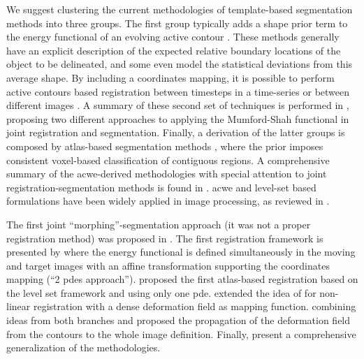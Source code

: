 We suggest clustering the
current methodologies of template-based segmentation methods into three groups.
The first group typically adds a shape prior term to the energy functional of
\citep{chan_level_2005,chen_using_2002,cremers_kernel_2006,gastaud_combining_2004,wyatt_map_2003,paragios_level_2003,yezzi_variational_2003,gorthi_segmentation_2009,pohl_unifying_2005,pohl_bayesian_2006,wang_joint_2006,guyader_combined_2011,besson_dream2s_2003,bertero_illposed_1988,cote_tractometer_2013}
an evolving active contour \citep{bresson_variational_2006, chan_level_2005,
chen_using_2002,cremers_kernel_2006,gastaud_combining_2004}.
These methods generally have an explicit description of the expected relative boundary
locations of the object to be delineated, and some even model the statistical deviations
from this average shape. By including a coordinates mapping, it is possible to perform
active contours based registration between timesteps in a time-series or between different
images \citep{bertalmio_morphing_2000,wyatt_map_2003,paragios_level_2003,vemuri_joint_2003,
yezzi_variational_2003}.
A summary of these second set of techniques is performed in \citep{droske_mumfordshah_2009},
proposing two different approaches to applying the Mumford-Shah \citep{mumford_optimal_1989}
functional in joint registration and segmentation. Finally, a derivation of the
latter groups is composed by atlas-based segmentation methods
\citep{gorthi_segmentation_2009,gorthi_active_2011,pohl_unifying_2005,
pohl_bayesian_2006,wang_joint_2006}, where the prior
imposes consistent voxel-based classification of contiguous regions.
A comprehensive summary of the \gls{acwe}-derived methodologies with special attention
to joint registration-segmentation methods is found in \citep{gorthi_active_2011}.
\Gls{acwe} and level-set based formulations have been widely applied in image
processing, as reviewed in \citep{suri_shape_2002}.

The first joint ``morphing''-segmentation approach (it was not a proper
registration method) was proposed in \citep{bertalmio_morphing_2000}. The first
registration framework is presented by \citep{yezzi_variational_2001} where the
energy functional is defined simultaneously in the moving and target images with
an affine transformation supporting the coordinates mapping (``2 \glspl*{pde} approach'').
\citep{vemuri_joint_2003} proposed the first atlas-based registration based on the
level set framework and using only one \gls*{pde}. \citep{unal_coupled_2005} extended the
idea of \citep{bertalmio_morphing_2000,yezzi_variational_2001} for non-linear
registration with a dense deformation field as mapping function. \citep{droske_mumfordshah_2009}
combining ideas from both branches and proposed the propagation of the
deformation field from the contours to the whole image definition. Finally,
\citep{gorthi_active_2011} present a comprehensive generalization of the methodologies.

